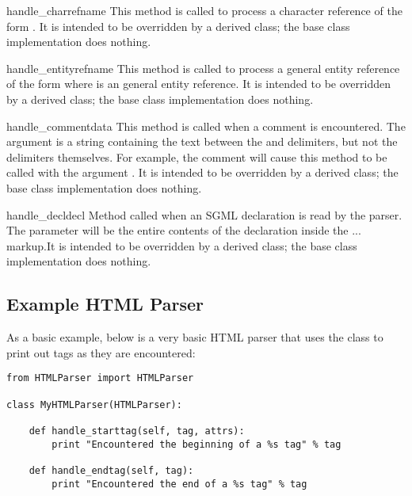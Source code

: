 \begin{methoddesc}{handle_charref}{name} This method is called to
process a character reference of the form .  It
is intended to be overridden by a derived class; the base class
implementation does nothing.  
\end{methoddesc}

\begin{methoddesc}{handle_entityref}{name} 
This method is called to process a general entity reference of the
form  where  is an general entity
reference.  It is intended to be overridden by a derived class; the
base class implementation does nothing.
\end{methoddesc}

\begin{methoddesc}{handle_comment}{data}
This method is called when a comment is encountered.  The
 argument is a string containing the text between the
\samp{<!--} and \samp{-->} delimiters, but not the delimiters
themselves.  For example, the comment  will cause
this method to be called with the argument .  It is
intended to be overridden by a derived class; the base class
implementation does nothing.
\end{methoddesc}

\begin{methoddesc}{handle_decl}{decl}
Method called when an SGML declaration is read by the parser.  The
 parameter will be the entire contents of the declaration
inside the \code{<!}...\code{>} markup.It is intended to be overridden
by a derived class; the base class implementation does nothing.
\end{methoddesc}


\subsection{Example HTML Parser \label{htmlparser-example}}

As a basic example, below is a very basic HTML parser that uses the
 class to print out tags as they are encountered:

\begin{verbatim}
from HTMLParser import HTMLParser

class MyHTMLParser(HTMLParser):

    def handle_starttag(self, tag, attrs):
        print "Encountered the beginning of a %s tag" % tag

    def handle_endtag(self, tag):
        print "Encountered the end of a %s tag" % tag
\end{verbatim}

